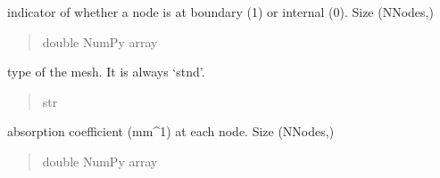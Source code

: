 \documentclass[letterpaper,10pt,english]{sphinxmanual}
\begin{document}
\begin{fulllineitems}
\begin{fulllineitems}
\label{\detokenize{_autosummary/nirfasterff.base.stnd_mesh.stndmesh:nirfasterff.base.stnd_mesh.stndmesh.bndvtx}}
\pysigstartsignatures
\pysigline
{}
\pysigstopsignatures
\sphinxAtStartPar
indicator of whether a node is at boundary (1) or internal (0). Size (NNodes,)
\begin{quote}\begin{description}
\sphinxAtStartPar
double NumPy array

\end{description}\end{quote}

\end{fulllineitems}


\begin{fulllineitems}
\label{\detokenize{_autosummary/nirfasterff.base.stnd_mesh.stndmesh:nirfasterff.base.stnd_mesh.stndmesh.type}}
\pysigstartsignatures
\pysigline
{}
\pysigstopsignatures
\sphinxAtStartPar
type of the mesh. It is always ‘stnd’.
\begin{quote}\begin{description}
\sphinxAtStartPar
str

\end{description}\end{quote}

\end{fulllineitems}


\begin{fulllineitems}
\label{\detokenize{_autosummary/nirfasterff.base.stnd_mesh.stndmesh:nirfasterff.base.stnd_mesh.stndmesh.mua}}
\pysigstartsignatures
\pysigline
{}
\pysigstopsignatures
\sphinxAtStartPar
absorption coefficient (mm\textasciicircum{}\sphinxhyphen{}1) at each node. Size (NNodes,)
\begin{quote}\begin{description}
\sphinxAtStartPar
double NumPy array

\end{description}\end{quote}


\end{fulllineitems}
\end{fulllineitems}
\end{document}
